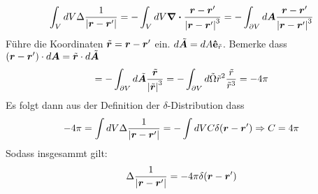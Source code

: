   \begin{equation*}
    \int_V dV \Delta \frac{1}{\abs{\vb*{r}-\vb*{r}'}} 
    = -\int_V dV \div \frac{\vb* r - \vb* r'}{\abs{\vb* r - \vb* r'}^3} 
    = -\int_{\partial V} 
    d\vb* A \frac{\vb* r - \vb* r'}{\abs{\vb* r - \vb* r'}^3}
  \end{equation*}
  Führe die Koordinaten $\tilde {\vb* {r}} = \vb* r-\vb* r'$ ein.
  $d\tilde {\vb* A} =dA \vu { e}_{\tilde r}$. Bemerke dass 
  $(\vb* r-\vb*r')\cdot d\vb* A= \tilde{\vb* r}\cdot d\tilde{\vb* A}$
  \begin{equation*}
    = -\int_{\partial V} 
    d\tilde{\vb*{A}} \frac{\tilde{\vb* {r}}}{\abs{\tilde{\vb*{r}}}^3}
    = -\int_{\partial V} 
    d\tilde \Omega \tilde r^2 \frac{\tilde r}{\tilde r^3} = -4\pi
  \end{equation*}
  Es folgt dann aus der Definition der $\delta$-Distribution dass
  \begin{equation*}
    -4\pi = \int dV \Delta \frac{1}{\abs{\vb*{r}-\vb*{r}'}} = -\int dV C\delta(\vb* r - \vb* r')
    \Rightarrow C=4\pi
  \end{equation*}
  Sodass insgesammt gilt:
  \begin{equation*}
    \Delta \frac{1}{\abs{\vb*{r}-\vb*{r}'}} = -4\pi \delta (\vb* r - \vb* r')
  \end{equation*}
   


